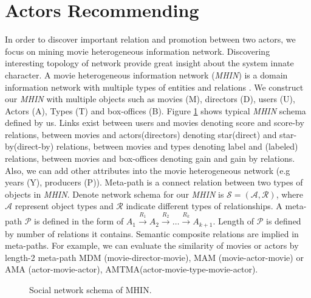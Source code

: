 \section{Actors Recommending}
\par In order to discover important relation and promotion between two actors, we focus on mining movie heterogeneous information network\cite{sun2012when}. Discovering interesting topology of network provide great insight about the system innate character. A movie heterogeneous information network (\emph{MHIN}) is a domain information network with multiple types of entities and relations \cite{sun2011pathsim:}. We construct our \emph{MHIN} with multiple objects such as movies (M), directors (D), users (U), Actors (A), Types (T) and box-offices (B). Figure \ref{fig:mhin} shows typical \emph{MHIN} schema defined by us. Links exist between users and movies denoting score and score-by relations, between movies and actors(directors) denoting star(direct) and star-by(direct-by) relations, between movies and types denoting label and (labeled) relations, between movies and box-offices denoting gain and gain by relations. Also, we can add other attributes into the movie heterogeneous network (e.g years (Y), producers (P)). Meta-path is a connect relation between two types of objects in \emph{MHIN}. Denote network schema for our \emph{MHIN} is $\mathcal{S}=(\mathcal{A}, \mathcal{R})$, where $\mathcal{A}$ represent object types and $\mathcal{R}$ indicate different types of relationships. A meta-path $\mathcal{P}$ is defined in the form of $A_1 \xrightarrow{R_1} A_2\xrightarrow{R_2} \dots\xrightarrow{R_k} A_{k+1}$. Length of $\mathcal{P}$ is defined by number of relations it contains. Semantic composite relations are implied in meta-paths\cite{sun2013meta-path-based}. For example, we can evaluate the similarity of movies or actors by length-2 meta-path MDM (movie-director-movie), MAM (movie-actor-movie) or AMA (actor-movie-actor), AMTMA(actor-movie-type-movie-actor).

\begin{figure}[!htbp]
\centering
{}
\caption{Social network schema of MHIN.}
\label{fig:mhin}
\end{figure}

